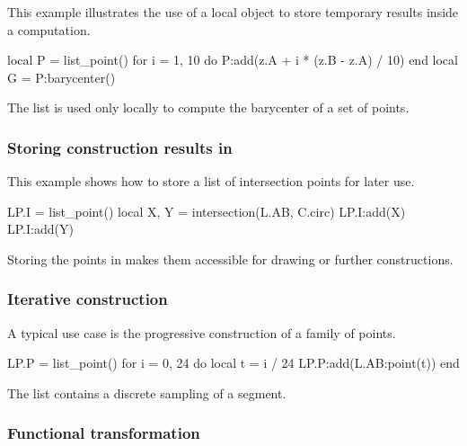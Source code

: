 This example illustrates the use of a local  object to store
temporary results inside a computation.

\begin{tkzexample}
local P = list_point()
for i = 1, 10 do
  P:add(z.A + i * (z.B - z.A) / 10)
end
local G = P:barycenter()
\end{tkzexample}

The list  is used only locally to compute the barycenter of a set of points.

\subsubsection{Storing construction results in }
\label{ssub:list_point_example_lp}

This example shows how to store a list of intersection points for later use.

\begin{tkzexample}
LP.I = list_point()
local X, Y = intersection(L.AB, C.circ)
LP.I:add(X)
LP.I:add(Y)
\end{tkzexample}

Storing the points in  makes them accessible for drawing
or further constructions.

\subsubsection{Iterative construction}
\label{ssub:list_point_example_iterative}

A typical use case is the progressive construction of a family of points.

\begin{tkzexample}
LP.P = list_point()
for i = 0, 24 do
  local t = i / 24
  LP.P:add(L.AB:point(t))
end
\end{tkzexample}

The list  contains a discrete sampling of a segment.

\subsubsection{Functional transformation}
\label{ssub:list_point_example_map}

